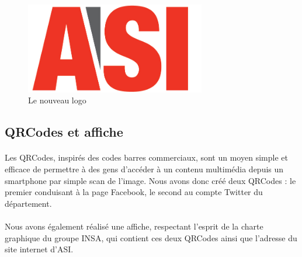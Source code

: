 		\begin{figure}
			\begin{center}
				\includegraphics[width=0.7\textwidth]{images/logo.jpg}
				\caption{Le nouveau logo}
			\end{center}
		\end{figure}

	\subsection{QRCodes et affiche}

		\paragraph{}
		Les QRCodes, inspirés des codes barres commerciaux, sont un moyen simple et efficace de permettre à des gens d'accéder à un contenu multimédia depuis un smartphone par simple scan de l'image. 
		Nous avons donc créé deux QRCodes : le premier conduisant à la page Facebook, le second au compte Twitter du département.
		
		\paragraph{}
		Nous avons également réalisé une affiche, respectant l'esprit de la charte graphique du groupe INSA, qui contient ces deux QRCodes ainsi que l'adresse du site internet d'ASI.


